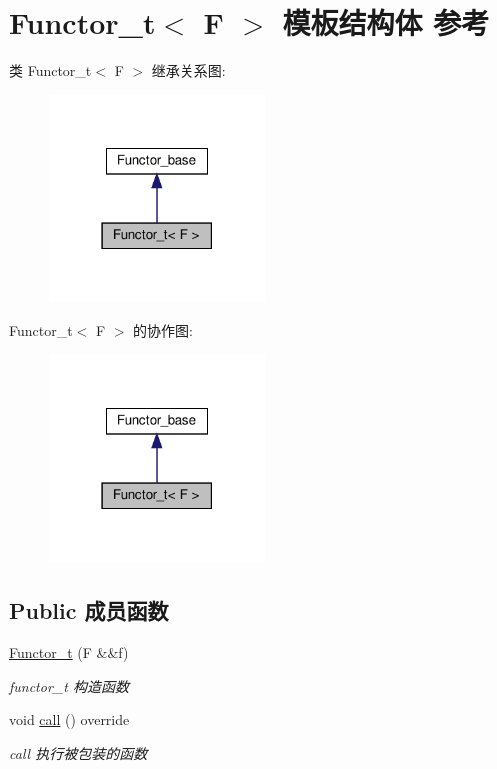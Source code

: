 \hypertarget{structFunctor__t}{}\section{Functor\+\_\+t$<$ F $>$ 模板结构体 参考}
\label{structFunctor__t}


类 Functor\+\_\+t$<$ F $>$ 继承关系图\+:
\nopagebreak
\begin{figure}[H]
\begin{center}
\leavevmode
\includegraphics[width=162pt]{structFunctor__t__inherit__graph}
\end{center}
\end{figure}


Functor\+\_\+t$<$ F $>$ 的协作图\+:
\nopagebreak
\begin{figure}[H]
\begin{center}
\leavevmode
\includegraphics[width=162pt]{structFunctor__t__coll__graph}
\end{center}
\end{figure}
\subsection*{Public 成员函数}
\begin{DoxyCompactItemize}
\item 
\hyperlink{structFunctor__t_a1e788b8c1022f99a0e80b334b31383a2}{Functor\+\_\+t} (F \&\&f)
\begin{DoxyCompactList}\small\item\em functor\+\_\+t 构造函数 \end{DoxyCompactList}\item 
\mbox{\label{structFunctor__t_ab4fc359c4f5955cc2d6a86214a5545ce}} 
void \hyperlink{structFunctor__t_ab4fc359c4f5955cc2d6a86214a5545ce}{call} () override
\begin{DoxyCompactList}\small\item\em call 执行被包装的函数 \end{DoxyCompactList}\end{DoxyCompactItemize}
